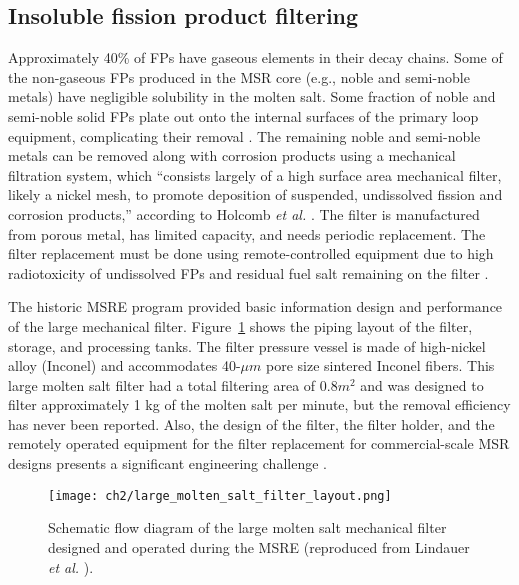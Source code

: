 \subsection{Insoluble fission product filtering}
Approximately 40\% of \glspl{FP} have gaseous elements in their decay chains. 
Some of the non-gaseous \glspl{FP} produced in the \gls{MSR} core (e.g., 
noble and semi-noble metals) have negligible solubility in the molten salt. 
Some fraction of noble and semi-noble solid \glspl{FP} plate out onto 
the internal surfaces of the primary loop equipment, complicating their 
removal \cite{briggs_molten-salt_1964}. The remaining noble and semi-noble 
metals can be removed along with corrosion products using a mechanical 
filtration system, which ``consists largely of a high surface area mechanical 
filter, likely a nickel mesh, to promote deposition of suspended, undissolved 
fission and corrosion products,'' according to Holcomb \emph{et al.} 
\cite{holcomb_instrumentation_2018}. The filter is manufactured from porous 
metal, has limited capacity, and needs periodic replacement. The filter 
replacement must be done using remote-controlled equipment due to high 
radiotoxicity of undissolved \glspl{FP} and residual fuel salt remaining on 
the filter \cite{mcfarlane_review_2019}. 

The historic \gls{MSRE} program provided basic information design and 
performance of the large mechanical filter. 
Figure~\ref{fig:large_filter_layout} shows the piping layout of the filter, 
storage, and processing tanks. The filter pressure vessel is made of 
high-nickel alloy (Inconel) and accommodates 40-$\mu m$ pore size sintered 
Inconel fibers. This large molten salt filter had a total filtering area of 
0.8${m^2}$ and was designed to filter approximately 1 kg of the molten salt 
per minute, but the removal efficiency has never been reported. Also, the 
design of the filter, the filter holder, and the remotely operated equipment 
for the filter replacement for commercial-scale \gls{MSR} designs presents a 
significant engineering challenge \cite{mcfarlane_review_2019}.
\begin{figure}[htp!] %
	\centering
	\texttt{[image: ch2/large\_molten\_salt\_filter\_layout.png]}
	\caption{Schematic flow diagram of the large molten salt mechanical filter 
		designed and operated during the \gls{MSRE} (reproduced from 
		Lindauer \emph{et al.} \cite{lindauer_design_1969}).}
	\label{fig:large_filter_layout}
\end{figure}

